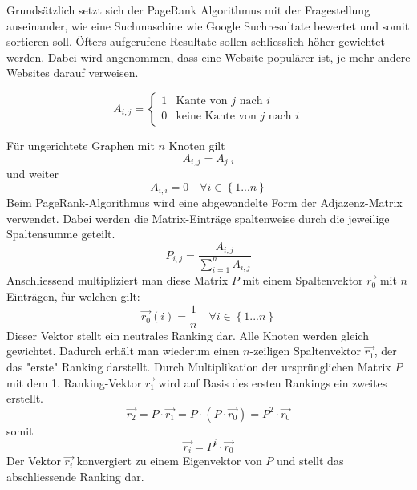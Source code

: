 Grundsätzlich setzt sich der PageRank Algorithmus mit der Fragestellung auseinander, wie eine Suchmaschine wie Google Suchresultate bewertet und somit sortieren soll. Öfters aufgerufene Resultate sollen schliesslich höher gewichtet werden. Dabei wird angenommen, dass eine Website populärer ist, je mehr andere Websites darauf verweisen.

\begin{equation}
A_{i,j}=\left\{ \begin{matrix}
1 & \text{Kante von $j$ nach $i$} \\ 0 & \text{keine Kante von $j$ nach $i$}
\end{matrix}
 \right.
\label{verkehr:Adja}
\end{equation}


Für ungerichtete Graphen mit $n$ Knoten gilt \begin{equation}A_{i,j}=A_{j,i}\end{equation} und weiter \begin{equation}A_{i,i}=0\quad\forall i\in \left\{1...n\right\}\end{equation}
Beim PageRank-Algorithmus wird eine abgewandelte Form der Adjazenz-Matrix verwendet.
Dabei werden die Matrix-Einträge spaltenweise durch die jeweilige Spaltensumme geteilt.
\begin{equation} P_{i,j}=\frac{A_{i,j}}{\sum_{i=1}^{n}A_{i,j}} \end{equation}
Anschliessend multipliziert man diese Matrix $P$ mit einem Spaltenvektor $\Vec{r_0}$ mit $n$ Einträgen, für welchen gilt:
\begin{equation} \Vec{r_0}(i) = \frac{1}{n} \quad\forall i\in \left\{1...n\right\} \end{equation}
Dieser Vektor stellt ein neutrales Ranking dar. Alle Knoten werden gleich gewichtet.
Dadurch erhält man wiederum einen $n$-zeiligen Spaltenvektor $\Vec{r_1}$, der das "erste" Ranking darstellt. Durch Multiplikation der ursprünglichen Matrix $P$ mit dem 1. Ranking-Vektor $\Vec{r_1}$ wird auf Basis des ersten Rankings ein zweites erstellt.
\begin{equation} \Vec{r_2} = P\cdot\Vec{r_1} = P\cdot(P\cdot\Vec{r_0}) = P^2\cdot\Vec{r_0}\end{equation}
somit
\begin{equation} \Vec{r_i} = P^i\cdot\Vec{r_0}\end{equation}
Der Vektor $\Vec{r_i}$ konvergiert zu einem Eigenvektor von $P$ und stellt das abschliessende Ranking dar.
